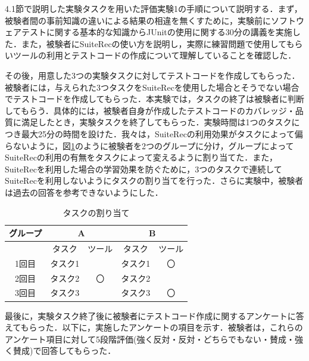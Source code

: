 \documentclass[12pt]{jarticle} %
\begin{document}
4.1節で説明した実験タスクを用いた評価実験1の手順について説明する．まず，被験者間の事前知識の違いによる結果の相違を無くすために，実験前にソフトウェアテストに関する基本的な知識からJUnitの使用に関する30分の講義を実施した．また，被験者に{\sf SuiteRec}の使い方を説明し，実際に練習問題で使用してもらいツールの利用とテストコードの作成について理解していることを確認した．

その後，用意した3つの実験タスクに対してテストコードを作成してもらった．被験者には，与えられた3つタスクを{\sf SuiteRec}を使用した場合とそうでない場合でテストコードを作成してもらった．本実験では，タスクの終了は被験者に判断してもらう．具体的には，被験者自身が作成したテストコードのカバレッジ・品質に満足したとき，実験タスクを終了してもらった．実験時間は1つのタスクにつき最大25分の時間を設けた．我々は，{\sf SuiteRec}の利用効果がタスクによって偏らないように，図\ref{assign}のように被験者を2つのグループに分け，グループによって{\sf SuiteRec}の利用の有無をタスクによって変えるように割り当てた．また，{\sf SuiteRec}を利用した場合の学習効果を防ぐために，3つのタスクで連続して{\sf SuiteRec}を利用しないようにタスクの割り当てを行った．さらに実験中，被験者は過去の回答を参考できないようにした．

\begin{table}[h]
\caption{タスクの割り当て}
\label{assign}
\begin{center}
\begin{tabular}{|c|l|l|l|c|}
\hline
グループ & \multicolumn{2}{c|}{A}                              & \multicolumn{2}{c|}{B}                           \\ \hline
     & \multicolumn{1}{c|}{タスク} & \multicolumn{1}{c|}{ツール} & \multicolumn{1}{c|}{タスク} & ツール                   \\ \hline
1回目  & タスク1                     &                          & タスク1                     & 〇                     \\ \hline
2回目  & タスク2                     & \multicolumn{1}{c|}{〇}   & タスク2                     & \multicolumn{1}{l|}{} \\ \hline
3回目  & タスク3                     &                          & タスク3                     & 〇                     \\ \hline
\end{tabular}
\end{center}
\end{table}


最後に，実験タスク終了後に被験者にテストコード作成に関するアンケートに答えてもらった．以下に，実施したアンケートの項目を示す．被験者は，これらのアンケート項目に対して5段階評価(強く反対・反対・どちらでもない・賛成・強く賛成)で回答してもらった．
\end{document}
